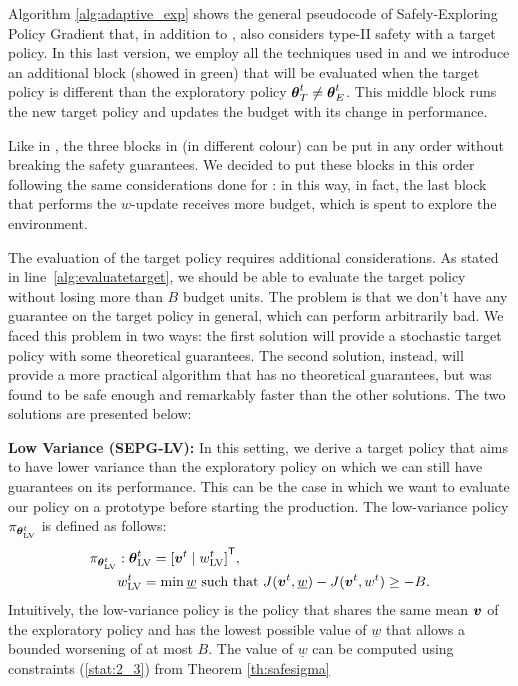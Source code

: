 Algorithm \ref{alg:adaptive_exp} shows the general pseudocode of Safely-Exploring Policy Gradient that, in addition to , also considers type-II safety with a target policy. In this last version, we employ all the techniques used in  and we introduce an additional block (showed in green) that will be evaluated when the target policy is different than the exploratory policy ${{\boldsymbol{\theta}}}^{t}_T \neq {\boldsymbol{\theta}}_E^t$. This middle block runs the new target policy and updates the budget with its change in performance.

\begin{note}
Like in , the three blocks in  (in different colour) can be put in any order without breaking the safety guarantees. We decided to put these blocks in this order following the same considerations done for : in this way, in fact, the last block that performs the $w$-update receives more budget, which is spent to explore the environment.
\end{note}

The evaluation of the target policy requires additional considerations. As stated in line~\ref{alg:evaluatetarget}, we should be able to evaluate the target policy without losing more than $B$ budget units. The problem is that we don't have any guarantee on the target policy in general, which can perform arbitrarily bad. We faced this problem in two ways: the first solution will provide a stochastic target policy with some theoretical guarantees. The second solution, instead, will provide a more practical algorithm that has no theoretical guarantees, but was found to be safe enough and remarkably faster than the other solutions. The two solutions are presented below:

\textbf{Low Variance (SEPG-LV):} In this setting, we derive a target policy that aims to have lower variance than the exploratory policy on which we can still have guarantees on its performance. This can be the case in which we want to evaluate our policy on a prototype before starting the production. The low-variance policy $\pi_{{\boldsymbol{\theta}}^t_{\text{LV}}}$ is defined as follows:
\begin{align*}
\pi_{{\boldsymbol{\theta}}^t_{\text{LV}}} &: {\boldsymbol{\theta}}^t_{\text{LV}} = {[\boldsymbol{v}^t \mid w^t_{\text{LV}}]}^{\mathsf{T}}, \\
&w^t_{\text{LV}} = \min {\underline{w}} \text{ such that } J(\boldsymbol{v}^t, \underline{w}) - J(\boldsymbol{v}^t, w^t) \geq -B .
\end{align*}
Intuitively, the low-variance policy is the policy that shares the same mean $\boldsymbol{v}$ of the exploratory policy and has the lowest possible value of $\underline{w}$ that allows a bounded worsening of at most $B$. The value of $\underline{w}$ can be computed using constraints (\ref{stat:2_3}) from Theorem \ref{th:safesigma}

